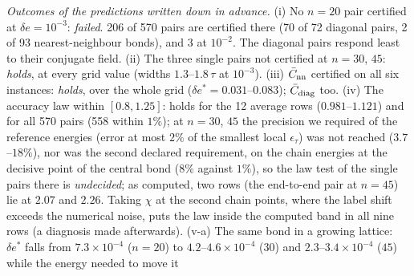 \documentclass[aps,prx,onecolumn,10pt,nofootinbib,longbibliography,floatfix]{revtex4-2}
\theoremstyle{remark}
\newcommand{\de}{\delta e}
\newcommand{\des}{\delta e^{*}}
\begin{document}
\emph{Outcomes of the predictions written down in advance.} (i) No $n=20$ pair certified at $\de=10^{-3}$: %
\emph{failed}. 206 of 570 pairs are certified there (70 of 72 diagonal pairs, 2 of 93 nearest-neighbour bonds), and 3 %
at $10^{-2}$. The diagonal pairs respond least to their conjugate field. (ii) The three single pairs not certified at %
$n=30$, $45$: \emph{holds}, at every grid value (widths $1.3$--$1.8\,\tau$ at $10^{-3}$). (iii) $\bar C_{\rm nn}$ %
certified on all six instances: \emph{holds}, over the whole grid ($\des=0.031$--$0.083$); $\bar C_{\rm diag}$ too. %
(iv) The accuracy law within $[0.8,1.25]$: holds for the 12 average rows ($0.981$--$1.121$) and for all 570 pairs %
(558 within $1\%$); at $n=30$, $45$ the precision we required of the reference energies (error at most $2\%$ of the %
smallest local $\epsilon_\tau$) was not reached ($3.7$--$18\%$), nor was the second declared requirement, on the chain %
energies at the decisive point of the central bond ($8\%$ against $1\%$), so the law test of the single pairs there is %
\emph{undecided}; as computed, two rows (the end-to-end pair at $n=45$) lie at $2.07$ and $2.26$. Taking $\chi$ at the %
second chain points, where the label shift exceeds the numerical noise, puts the law inside the computed band in all
nine rows (a diagnosis made afterwards). (v-a) The same bond in a growing lattice: $\des$ falls from $7.3\times10^{-4}$ %
($n=20$) to $4.2$--$4.6\times10^{-4}$ ($30$) and $2.3$--$3.4\times10^{-4}$ ($45$) while the energy needed to move it %
\end{document}
